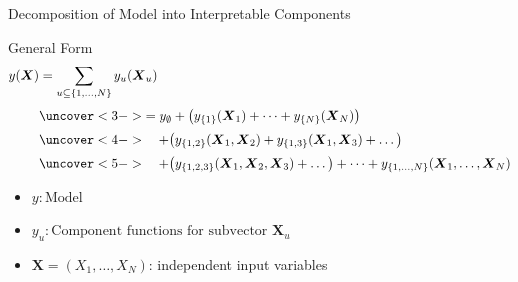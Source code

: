   

\begin{frame}{Decomposition of Model into Interpretable Components} %
\begin{block}{General Form}
\[
  \begin{aligned}
    y(\boldsymbol{X}) 
    &= \sum_{u \subseteq \{1,\dots,N\}} y_{u}(\boldsymbol{X}_u) \\[3pt]
    &\uncover<3->{= y_{\emptyset} 
       + \big( y_{\{1\}}(\boldsymbol{X}_1) + \dots + y_{\{N\}}(\boldsymbol{X}_N) \big)} \\[2pt]
    &\uncover<4->{\quad + \big( y_{\{1, 2\}}(\boldsymbol{X}_1,\boldsymbol{X}_2) 
                 + y_{\{1, 3\}}(\boldsymbol{X}_1,\boldsymbol{X}_3) + \dots \big)} \\[2pt]
    &\uncover<5->{\quad + \big( y_{\{1, 2, 3\}}(\boldsymbol{X}_1,\boldsymbol{X}_2,\boldsymbol{X}_3) + \dots \big) 
       + \dots + y_{\{1, \dots, N\}}(\boldsymbol{X}_1, \dots, \boldsymbol{X}_N)}
  \end{aligned}
\]
\end{block}

\begin{itemize}
  \item<2-> $y : \text{Model}$
  \item<2-> $y_u : \text{Component functions for subvector } \boldsymbol{X}_u$
  \item<2-> $\boldsymbol{X} = (X_1, \dots, X_N)$: independent input variables
\end{itemize}
\end{frame}

